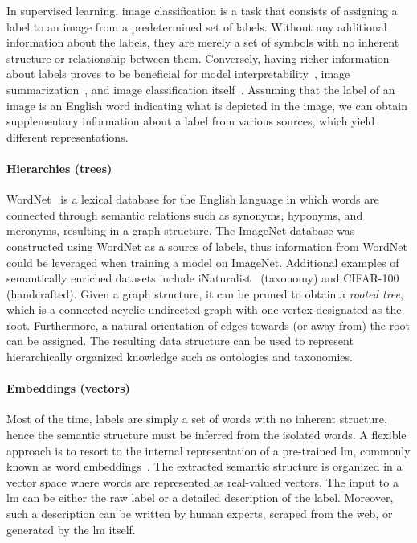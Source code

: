In supervised learning, image classification is a task that consists of assigning a label to an image from a predetermined set of labels.
Without any additional information about the labels, they are merely a set of symbols with no inherent structure or relationship between them.
Conversely, having richer information about labels proves to be beneficial for model interpretability~\cite{ImprovingInterDong2017}, image summarization~\cite{SemanticImagePasini2022}, and image classification itself~\cite{MakingBetterMBertin2019}. Assuming that the label of an image is an English word indicating what is depicted in the image, we can obtain supplementary information about a label from various sources, which yield different representations.

\paragraph{Hierarchies (trees)}
\label{par:hierarchies-tree}
WordNet~\cite{WordnetMi1995} is a lexical database for the English language in which words are connected through semantic relations such as synonyms, hyponyms, and meronyms, resulting in a graph structure. The ImageNet database was constructed using WordNet as a source of labels, thus information from WordNet could be leveraged when training a model on ImageNet. Additional examples of semantically enriched datasets include iNaturalist~\cite{TheInaturalistHorn2017} (taxonomy) and CIFAR-100~\cite{LearningMultipKrizhe2009} (handcrafted). Given a graph structure, it can be pruned to obtain a \emph{rooted tree}, which is a connected acyclic undirected graph with one vertex designated as the root. Furthermore, a natural orientation of edges towards (or away from) the root can be assigned. The resulting data structure can be used to represent hierarchically organized knowledge such as ontologies and taxonomies.

\paragraph{Embeddings (vectors)}
\label{par:embeddings-vectors}
Most of the time, labels are simply a set of words with no inherent structure, hence the semantic structure must be inferred from the isolated words. A flexible approach is to resort to the internal representation of a pre-trained \acrfull{lm}, commonly known as word embeddings~\cite{BeyondWordEmbIncitt2023}. The extracted semantic structure is organized in a vector space where words are represented as real-valued vectors. The input to a \acrshort{lm} can be either the raw label or a detailed description of the label. Moreover, such a description can be written by human experts, scraped from the web, or generated by the \acrshort{lm} itself.\medskip

